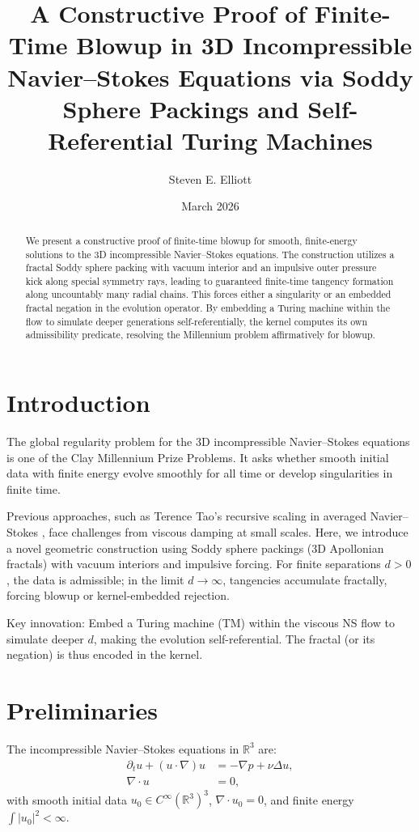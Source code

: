 \documentclass{article}
\title{A Constructive Proof of Finite-Time Blowup in 3D Incompressible Navier--Stokes Equations via Soddy Sphere Packings and Self-Referential Turing Machines}
\author{Steven E. Elliott}
\date{March 2026}
\begin{document}
\maketitle

\begin{abstract}
We present a constructive proof of finite-time blowup for smooth, finite-energy solutions to the 3D incompressible Navier--Stokes equations. The construction utilizes a fractal Soddy sphere packing with vacuum interior and an impulsive outer pressure kick along special symmetry rays, leading to guaranteed finite-time tangency formation along uncountably many radial chains. This forces either a singularity or an embedded fractal negation in the evolution operator. By embedding a Turing machine within the flow to simulate deeper generations self-referentially, the kernel computes its own admissibility predicate, resolving the Millennium problem affirmatively for blowup.
\end{abstract}

\section{Introduction}
The global regularity problem for the 3D incompressible Navier--Stokes equations is one of the Clay Millennium Prize Problems. It asks whether smooth initial data with finite energy evolve smoothly for all time or develop singularities in finite time.

Previous approaches, such as Terence Tao's recursive scaling in averaged Navier--Stokes \cite{tao2016finite}, face challenges from viscous damping at small scales. Here, we introduce a novel geometric construction using Soddy sphere packings (3D Apollonian fractals) with vacuum interiors and impulsive forcing. For finite separations $d > 0$, the data is admissible; in the limit $d \to \infty$, tangencies accumulate fractally, forcing blowup or kernel-embedded rejection.

Key innovation: Embed a Turing machine (TM) within the viscous NS flow \cite{dyhr2025turing} to simulate deeper $d$, making the evolution self-referential. The fractal (or its negation) is thus encoded in the kernel.

\section{Preliminaries}
The incompressible Navier--Stokes equations in $\mathbb{R}^3$ are:
\begin{align}
\partial_t u + (u \cdot \nabla) u &= -\nabla p + \nu \Delta u, \\
\nabla \cdot u &= 0,
\end{align}
with smooth initial data $u_0 \in C^\infty(\mathbb{R}^3)^3$, $\nabla \cdot u_0 = 0$, and finite energy $\int |u_0|^2 < \infty$.
\end{document}
